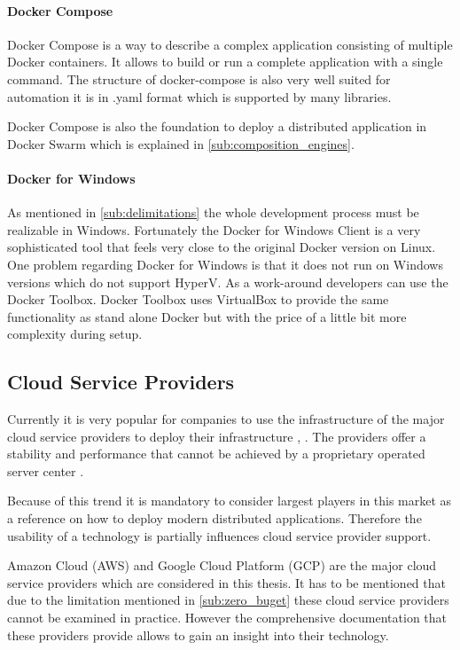 \paragraph{Docker Compose}

Docker Compose is a way to describe a complex application consisting of multiple
Docker containers. It allows to build or run a complete \ms{} application with a
single command. The structure of docker-compose is also very well suited for
automation it is in .yaml format which is supported by many libraries.

Docker Compose is also the foundation to deploy a distributed application in
Docker Swarm which is explained in \autoref{sub:composition_engines}.

\paragraph{Docker for Windows}

As mentioned in \autoref{sub:delimitations} the whole \og{} development
process must be realizable in Windows. Fortunately the Docker for Windows Client
is a very sophisticated tool that feels very close to the original Docker
version on Linux. One problem regarding Docker for Windows is that it does not
run on Windows versions which do not support HyperV. As a work-around developers
can use the Docker Toolbox. Docker Toolbox uses VirtualBox to provide the
same functionality as stand alone Docker but with the price of a little bit more
complexity during setup.

\subsection{Cloud Service Providers}

Currently it is very popular for companies to use the infrastructure of the
major cloud service providers to deploy their infrastructure
\cite{roberts2016aws}, \cite{pronschinske2015turbine}. The providers offer a
stability and performance that cannot be achieved by a proprietary operated
server center \cite{gai2012towards}.

Because of this trend it is mandatory to consider largest players in this market
as a reference on how to deploy modern distributed applications. Therefore the
usability of a technology is partially influences cloud service provider
support. 

Amazon Cloud (AWS) and Google Cloud Platform (GCP) are the major cloud service
providers which are considered in this thesis. It has to be mentioned that due
to the limitation mentioned in \autoref{sub:zero_buget} these cloud service
providers cannot be examined in practice. However the comprehensive
documentation that these providers provide allows to gain an insight into their
technology.

